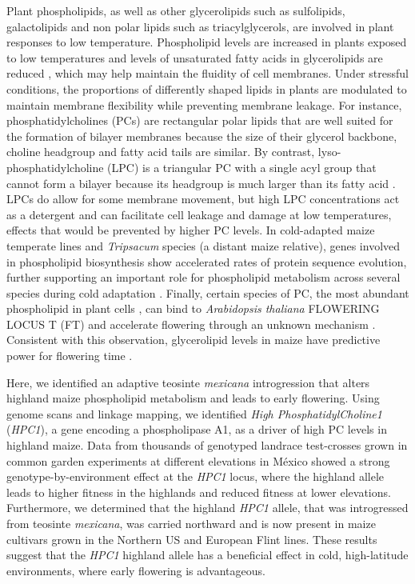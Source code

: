 \documentclass[9pt,twocolumn,twoside,lineno]{biorxiv}
\newcommand{\mex}{\textit{mexicana}\xspace}
\newcommand{\hpc}{\textit{HPC1}\xspace}
\begin{document}
Plant phospholipids, as well as other glycerolipids such as sulfolipids, galactolipids and non polar lipids such as triacylglycerols, are involved in plant responses to low temperature.
Phospholipid levels are increased in plants exposed to low temperatures \cite{Degenkolbe2012-wf} and levels of unsaturated fatty acids in glycerolipids are reduced \cite{Welti2002-uk, Lynch1987-ln}, which may help maintain the fluidity of cell membranes.
Under stressful conditions, the proportions of differently shaped lipids in plants are modulated to maintain membrane flexibility while preventing membrane leakage. 
For instance, phosphatidylcholines (PCs) are rectangular polar lipids that are well suited for the formation of bilayer membranes because the size of their glycerol backbone, choline headgroup and fatty acid tails are similar.
By contrast, lyso-phosphatidylcholine (LPC) is a triangular PC with a single acyl group that cannot form a bilayer because its headgroup is much larger than its fatty acid \cite{Jouhet2013-fv}.
LPCs do allow for some membrane movement, but high LPC concentrations act as a detergent \cite{Henriksen2010-cm} and can facilitate cell leakage and damage at low temperatures, effects that would be prevented by higher PC levels.
In cold-adapted maize temperate lines and \textit{Tripsacum} species (a distant maize relative), genes involved in  phospholipid biosynthesis show accelerated rates of protein sequence evolution, further supporting an important role for phospholipid metabolism across several species during cold adaptation \cite{Yan2019-tx}. 
Finally, certain species of PC, the most abundant phospholipid  in plant cells \cite{Gu2017-nd}, can bind to \textit{Arabidopsis thaliana} FLOWERING LOCUS T (FT) and accelerate flowering through an unknown mechanism \cite{Nakamura2014-qf}. 
Consistent with this observation, glycerolipid levels in maize have predictive power for flowering time \cite{Riedelsheimer2013-bd}. 

Here, we identified an adaptive teosinte \mex introgression that alters highland maize phospholipid metabolism and leads to early flowering.
Using genome scans and linkage mapping, we identified \textit{High PhosphatidylCholine1} (\hpc), a gene encoding a phospholipase A1, as a driver of high PC levels in highland maize. 
Data from thousands of genotyped landrace test-crosses grown in common garden experiments at different elevations in M\'exico showed a strong genotype-by-environment effect at the \hpc locus, where the highland allele leads to higher fitness in the highlands and reduced fitness at lower elevations.
Furthermore, we determined that the highland \hpc allele, that was introgressed from teosinte \mex, was carried northward and is now present in maize cultivars grown in the Northern US and European Flint lines.
These results suggest that the \hpc highland allele has a beneficial effect in cold, high-latitude environments, where early flowering is advantageous.
\end{document}
